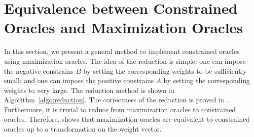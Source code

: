 \documentclass{article}
\newcommand{\junk}[1]{}
\newcommand{\M}{\mathcal M}
\newcommand{\B}{\mathcal B}
\DeclareMathOperator{\rank}{width}
\DeclareMathOperator{\Exchange}{Exchange}
\newcommand{\MultiIdent}{\textsc{TopK}\xspace}
\newcommand{\MultiBandit}{\textsc{MB}\xspace}
\newcommand{\Matroid}{\textsc{Matroid}\xspace}
\newcommand{\Match}{\textsc{Match}\xspace}
\newcommand{\Path}{\textsc{Path}\xspace}
\begin{document}
\junk{
\begin{fact} 
Let $\M\subseteq 2^{[n]}$ be one of our example types of decision classes. 
Then we can construct the exchange class for $\M$ and upper bound $\rank(\M)$ as follows.
\begin{itemize}
\item Define $\B_{\Matroid(n)}=\big\{(\{i\},\{j\})\mid\forall i\in [n], j\in [n]\big\}$. If $\M=\M_{\Matroid(T,\sigma)}$, then we have $\B_{\Matroid(n)} \in \Exchange(\M)$ and $\rank(\M) \le 2$.	  
\item Define $\B_{\Match(G,\sigma)}=\big\{(C_+,C_-)\mid \sigma^{-1}(C_+\cup C_-) \text{ is a cycle of }G\big\}$. If $\M=\M_{\Match(G,\sigma)}$, then we have $\B_{\Match(G)} \in \Exchange(\M)$ and $\rank(\M) \le |V|$.	  
\item Define 
$\B_{\Path(G,\sigma)}=\big\{ (P_1, P_2)\mid\sigma^{-1}(P_1)\text{ and }\sigma^{-1}(P_2)\text{ are two disjoint paths of }G\text{ with same endpoints}\big\}$. 
If $\M=\M_{\Path(G,s,t,\sigma)}$, then we have $\B_{\Path(G,\sigma)} \in \Exchange(\M)$ and $\rank(\M) \le |V|$.	  
\end{itemize}
Moreover, since \Matroid encompasses both \MultiIdent and \MultiBandit types of decision classes, we see that $\rank(\M) \le 2$ for decision classes $\M$ of these types.
\label{lemma:example-exchange-class}
\end{fact}
}


\section{Equivalence between Constrained Oracles and Maximization Oracles}
\label{section:equivalence-constrained-oracle}

In this section, we present a general method to implement constrained oracles using maximization oracles.
The idea of the reduction is simple: one can impose the negative constrains $B$ by setting the corresponding weights to be sufficiently small; and one can impose the positive constrains $A$ by setting the corresponding weights to very large.
The reduction method is shown in Algorithm~\ref{algo:reduction}.
The correctness of the reduction is proved in .
Furthermore, it is trivial to reduce from maximization oracles to constrained oracles. 
Therefore,  shows that maximization oracles are equivalent to constrained oracles up to a transformation on the weight vector. 
\end{document}
